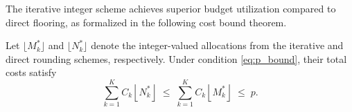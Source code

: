 The iterative integer scheme achieves superior budget utilization compared to direct flooring, as formalized in the following cost bound theorem.

\begin{theorem}
\label{thm:MFMC_New_IntegerValued_Cost}
Let $\lfloor M_k^* \rfloor$ and $\lfloor N_k^* \rfloor$ denote the integer-valued allocations from the iterative and direct rounding schemes, respectively. Under condition \eqref{eq:p_bound}, their total costs satisfy
\begin{equation}\label{eq:Iterative_integer_sample_size_cost_bound}
    \sum_{k=1}^K C_k \left\lfloor N_k^* \right\rfloor
    \;\le\;
    \sum_{k=1}^K C_k \left\lfloor M_k^* \right\rfloor
    \;\le\;
    p.
\end{equation}
\end{theorem}

